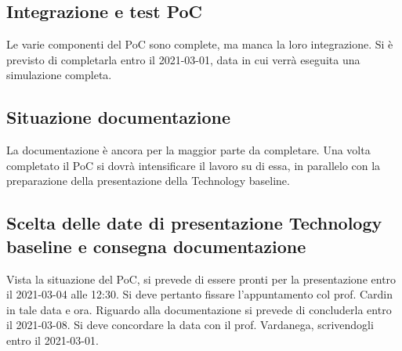\subsection*{Integrazione e test PoC}
Le varie componenti del PoC sono complete, ma manca la loro integrazione. Si è previsto di completarla entro il 2021-03-01, data in cui verrà eseguita una simulazione completa.

\subsection*{Situazione documentazione}
La documentazione è ancora per la maggior parte da completare. Una volta completato il PoC si dovrà intensificare il lavoro su di essa, in parallelo con la preparazione della presentazione della Technology baseline.

\subsection*{Scelta delle date di presentazione Technology baseline e consegna documentazione}
Vista la situazione del PoC, si prevede di essere pronti per la presentazione entro il 2021-03-04 alle 12:30. Si deve pertanto fissare l'appuntamento col prof. Cardin in tale data e ora.
Riguardo alla documentazione si prevede di concluderla entro il 2021-03-08. Si deve concordare la data con il prof. Vardanega, scrivendogli entro il 2021-03-01.

